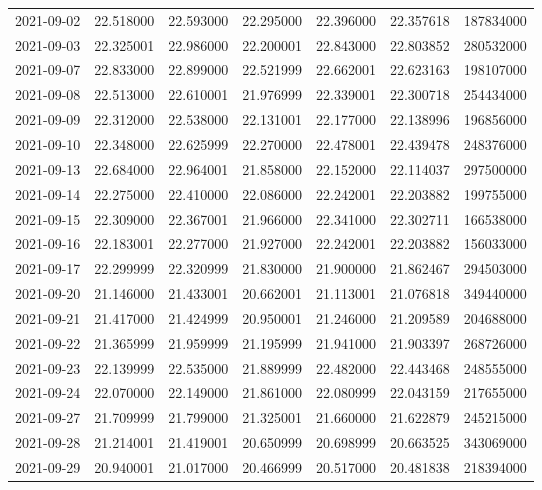 \begin{tabular}{lrrrrrr}
2021-09-02 &   22.518000 &   22.593000 &   22.295000 &   22.396000 &   22.357618 &   187834000 \\
2021-09-03 &   22.325001 &   22.986000 &   22.200001 &   22.843000 &   22.803852 &   280532000 \\
2021-09-07 &   22.833000 &   22.899000 &   22.521999 &   22.662001 &   22.623163 &   198107000 \\
2021-09-08 &   22.513000 &   22.610001 &   21.976999 &   22.339001 &   22.300718 &   254434000 \\
2021-09-09 &   22.312000 &   22.538000 &   22.131001 &   22.177000 &   22.138996 &   196856000 \\
2021-09-10 &   22.348000 &   22.625999 &   22.270000 &   22.478001 &   22.439478 &   248376000 \\
2021-09-13 &   22.684000 &   22.964001 &   21.858000 &   22.152000 &   22.114037 &   297500000 \\
2021-09-14 &   22.275000 &   22.410000 &   22.086000 &   22.242001 &   22.203882 &   199755000 \\
2021-09-15 &   22.309000 &   22.367001 &   21.966000 &   22.341000 &   22.302711 &   166538000 \\
2021-09-16 &   22.183001 &   22.277000 &   21.927000 &   22.242001 &   22.203882 &   156033000 \\
2021-09-17 &   22.299999 &   22.320999 &   21.830000 &   21.900000 &   21.862467 &   294503000 \\
2021-09-20 &   21.146000 &   21.433001 &   20.662001 &   21.113001 &   21.076818 &   349440000 \\
2021-09-21 &   21.417000 &   21.424999 &   20.950001 &   21.246000 &   21.209589 &   204688000 \\
2021-09-22 &   21.365999 &   21.959999 &   21.195999 &   21.941000 &   21.903397 &   268726000 \\
2021-09-23 &   22.139999 &   22.535000 &   21.889999 &   22.482000 &   22.443468 &   248555000 \\
2021-09-24 &   22.070000 &   22.149000 &   21.861000 &   22.080999 &   22.043159 &   217655000 \\
2021-09-27 &   21.709999 &   21.799000 &   21.325001 &   21.660000 &   21.622879 &   245215000 \\
2021-09-28 &   21.214001 &   21.419001 &   20.650999 &   20.698999 &   20.663525 &   343069000 \\
2021-09-29 &   20.940001 &   21.017000 &   20.466999 &   20.517000 &   20.481838 &   218394000 \\

\end{tabular}
